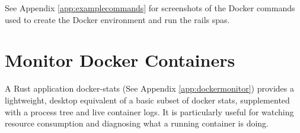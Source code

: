 See Appendix \ref{app:examplecommands} for screenshots of the Docker commands used to create the Docker environment and run the \gls{rails} \glspl{spa}.

\section{Monitor Docker Containers}
A Rust application docker-stats (See Appendix \ref{app:dockermonitor}) provides a lightweight, desktop equivalent of a basic subset of docker stats, supplemented with a process tree and live container logs. It is particularly useful for watching resource consumption and diagnosing what a running container is doing.
